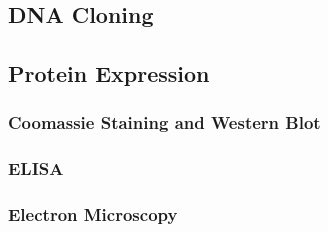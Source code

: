 \subsection{DNA Cloning}
\subsection{Protein Expression}
\begin{figure}

\end{figure}
\subsubsection{Coomassie Staining and Western Blot} 
\subsubsection{ELISA}
\begin{figure}

\end{figure}

\subsubsection{Electron Microscopy}